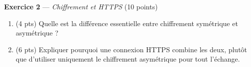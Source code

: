 \bigskip

\textbf{Exercice 2} --- \textit{Chiffrement et HTTPS} \hfill (10 points)

\begin{enumerate}
  \item (4 pts) Quelle est la différence essentielle entre chiffrement symétrique et asymétrique ?
  \item (6 pts) Expliquer pourquoi une connexion HTTPS combine les deux, plutôt que d'utiliser uniquement le chiffrement asymétrique pour tout l'échange.
\end{enumerate}
